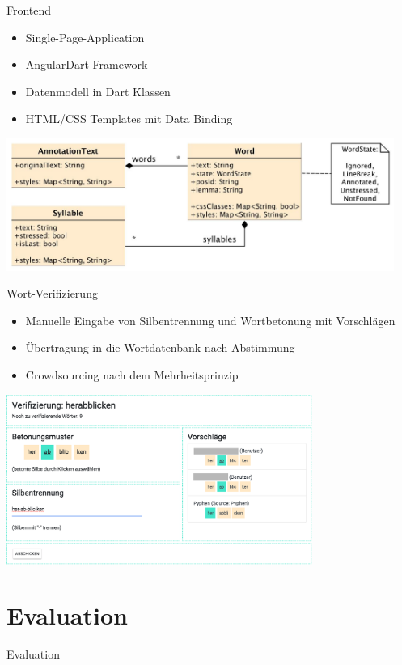\documentclass{beamer}
\begin{document}
\begin{frame}{Frontend}
\begin{itemize}
	\item Single-Page-Application
	\item AngularDart Framework
	\item Datenmodell in Dart Klassen
	\item HTML/CSS Templates mit Data Binding
\end{itemize}
\centering
\includegraphics[width=0.95\textwidth]{../figures/frontend/uml-annotationtext}
\end{frame}

\begin{frame}{Wort-Verifizierung}
\begin{itemize}
	\item Manuelle Eingabe von Silbentrennung und Wortbetonung mit Vorschlägen
	\item Übertragung in die Wortdatenbank nach Abstimmung
	\item Crowdsourcing nach dem Mehrheitsprinzip
\end{itemize}
\centering
\includegraphics[width=0.75\textwidth]{../figures/frontend/verifizierung}
\end{frame}

\section{Evaluation}
\begin{frame}
\centering
\huge{Evaluation}
\end{frame}
\end{document}
